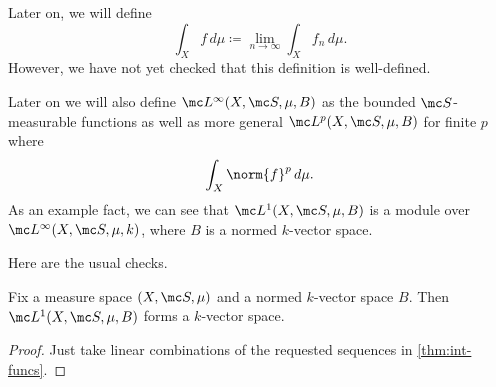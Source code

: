 \documentclass[../notes.tex]{subfiles}
\begin{document}
\begin{remark}
	Later on, we will define
	\[\int_X f\,d\mu\coloneqq\lim_{n\to\infty}\int_Xf_n\,d\mu.\]
	However, we have not yet checked that this definition is well-defined.
\end{remark}
\begin{remark}
	Later on we will also define $\mc L^\infty(X,\mc S,\mu,B)$ as the bounded $\mc S$-measurable functions as well as more general $\mc L^p(X,\mc S,\mu,B)$ for finite $p$ where
	\[\int_X\norm{f}^p\,d\mu.\]
	As an example fact, we can see that $\mc L^1(X,\mc S,\mu,B)$ is a module over $\mc L^\infty(X,\mc S,\mu,k)$, where $B$ is a normed $k$-vector space.
\end{remark}
Here are the usual checks.
\begin{lemma}
	Fix a measure space $(X,\mc S,\mu)$ and a normed $k$-vector space $B$. Then $\mc L^1(X,\mc S,\mu,B)$ forms a $k$-vector space.
\end{lemma}
\begin{proof}
	Just take linear combinations of the requested sequences in \autoref{thm:int-funcs}.
\end{proof}
\end{document}
